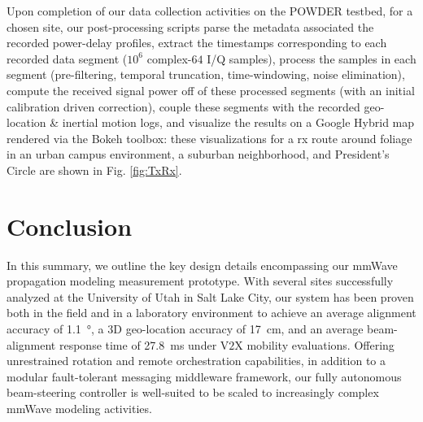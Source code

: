 \documentclass[10pt,twocolumn]{IEEEtran}
\begin{document}
\vspace{\extraspacebeforesubsubsec} Upon completion of our data collection activities on the POWDER testbed, for a chosen site, our post-processing scripts parse the metadata associated the recorded power-delay profiles, extract the timestamps corresponding to each recorded data segment ($10^6$ complex-$64$ I/Q samples), process the samples in each segment (pre-filtering, temporal truncation, time-windowing, noise elimination), compute the received signal power off of these processed segments (with an initial calibration driven correction), couple these segments with the recorded geo-location \& inertial motion logs, and visualize the results on a Google Hybrid map rendered via the Bokeh toolbox: these visualizations for a \gls{rx} route around foliage in an urban campus environment, a suburban neighborhood, and President's Circle are shown in Fig. \ref{fig:TxRx}.

\vspace{\extraspacebeforesec}
\section{Conclusion}\label{III}
In this summary, we outline the key design details encompassing our mmWave propagation modeling measurement prototype. With several sites successfully analyzed at the University of Utah in Salt Lake City, our system has been proven both in the field and in a laboratory environment to achieve an average alignment accuracy of \SI{1.1}{\degree}, a $3$D geo-location accuracy of \SI{17}{\centi\meter}, and an average beam-alignment response time of \SI{27.8}{\milli\second} under V$2$X mobility evaluations. Offering unrestrained rotation and remote orchestration capabilities, in addition to a modular fault-tolerant messaging middleware framework, our fully autonomous beam-steering controller is well-suited to be scaled to increasingly complex mmWave modeling activities.

\vspace{0mm}

\balance

\vspace{-4mm}

\end{document}
